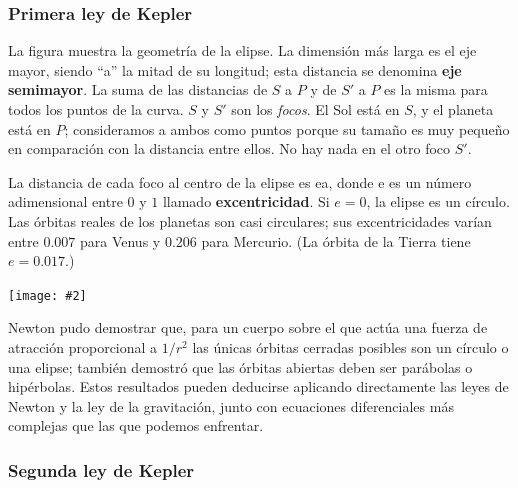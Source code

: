 \documentclass{article}
\newcommand{\newtitle}[1]{
    \color{titleColor}
    \subsubsection{#1}
    \color{black}
}
\newcommand{\bl}[1]{\textbf{#1}}
\newcommand{\ladoALado}[4]{
    \begin{minipage}[t]{#3\textwidth}
        \vspace{0pt}
        #1
    \end{minipage}
    \hfill
    \begin{minipage}[t]{#4\textwidth}
        \vspace{0pt}
        \centering
        \texttt{[image: \#2]}
    \end{minipage}
}
\begin{document}
    \newtitle{Primera ley de Kepler}

    \ladoALado{
        \par La ﬁgura muestra la geometría de la elipse. La dimensión más larga es el eje mayor, siendo “a” la mitad de su longitud; esta distancia se denomina \bl{eje semimayor}. La suma de las distancias de $S$ a $P$ y de $S'$ a $P$ es la misma para todos los puntos de la curva. $S$ y $S'$ son los \textit{focos}. El Sol está en $S$, y el planeta está en $P$; consideramos a ambos como puntos porque su tamaño es muy pequeño en comparación con la distancia entre ellos. No hay nada en el otro foco $S'$.

        \vspace{0.2cm}

        \par La distancia de cada foco al centro de la elipse es ea, donde e es un número adimensional entre $0$ y $1$ llamado \bl{excentricidad}. Si $e = 0$, la elipse es un círculo. Las órbitas reales de los planetas son casi circulares; sus excentricidades varían entre $0.007$ para Venus y $0.206$ para Mercurio. (La órbita de la Tierra tiene $e = 0.017$.)
    }{img/11.5-1.png}{0.6}{0.4}

    \vspace{0.4cm}

    \par Newton pudo demostrar que, para un cuerpo sobre el que actúa una fuerza de atracción proporcional a $1/r^2$ las únicas órbitas cerradas posibles son un círculo o una elipse; también demostró que las órbitas abiertas deben ser parábolas o hipérbolas. Estos resultados pueden deducirse aplicando directamente las leyes de Newton y la ley de la gravitación, junto con ecuaciones diferenciales más complejas que las que podemos enfrentar.

    \newtitle{Segunda ley de Kepler}
\end{document}
